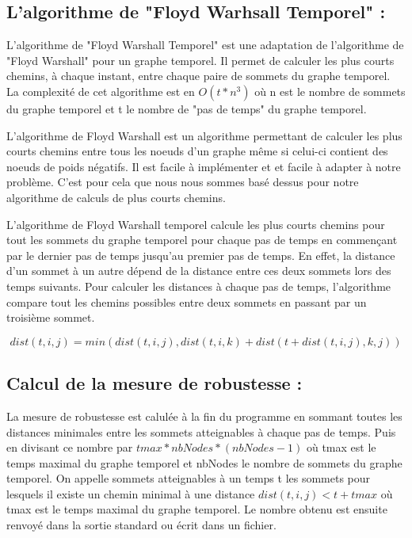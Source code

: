 \subsection{L'algorithme de "Floyd Warhsall Temporel" :}
L'algorithme de "Floyd Warshall Temporel" est une adaptation de l'algorithme de "Floyd Warshall"\cite{hougardy2010floyd} pour un graphe temporel. 
Il permet de calculer les plus courts chemins, à chaque instant, entre chaque paire de sommets du graphe temporel.
La complexité de cet algorithme est en $O(t*n^3)$ où n est le nombre de sommets du graphe temporel et t le nombre de "pas de temps" du graphe temporel.

L'algorithme de Floyd Warshall est un algorithme permettant de calculer les plus courts chemins entre tous les noeuds d'un graphe 
même si celui-ci contient des noeuds de poids négatifs. Il est facile à implémenter et et facile à adapter à notre problème.
C'est pour cela que nous nous sommes basé dessus pour notre algorithme de calculs de plus courts chemins. 

L'algorithme de Floyd Warshall temporel calcule les plus courts chemins pour tout les sommets du graphe temporel 
pour chaque pas de temps en commençant par le dernier pas de temps jusqu'au premier pas de temps.
En effet, la distance d'un sommet à un autre dépend de la distance entre ces deux sommets lors des temps suivants. 
Pour calculer les distances à chaque pas de temps, l'algorithme compare 
tout les chemins possibles entre deux sommets en passant par un troisième sommet. 

\begin{equation}
    dist(t,i,j) = min(dist(t,i,j), dist(t,i,k) + dist(t+ dist(t,i,j), k,j))
\end{equation}

\subsection{Calcul de la mesure de robustesse :}
La mesure de robustesse est calulée à la fin du programme en sommant toutes 
les distances minimales entre les sommets atteignables à chaque pas de temps. 
Puis en divisant ce nombre par $tmax * nbNodes * (nbNodes - 1)$ où tmax est le temps maximal du graphe temporel et nbNodes le nombre de sommets du graphe temporel.
On appelle sommets atteignables à un temps t les sommets pour lesquels il existe un chemin 
minimal à une distance 
$dist(t,i,j) < t + tmax$ où tmax est le temps maximal du graphe temporel.
Le nombre obtenu est ensuite renvoyé dans la sortie standard ou écrit dans un fichier.
